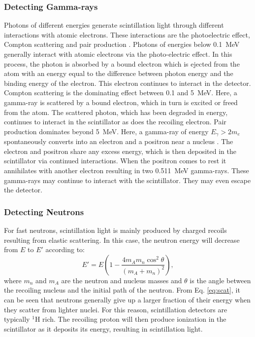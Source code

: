 \documentclass[main.tex]{subfiles}
\begin{document}
\subsubsection{Detecting Gamma-rays}
Photons of different energies generate scintillation light through different interactions with atomic electrons. These interactions are the photoelectric effect, Compton scattering and pair production \cite{Krane}. 
Photons of energies below \SI{0.1}{\MeV} generally interact with atomic electrons via the photo-electric effect. In this process, the photon is absorbed by a bound electron which is ejected from the atom with an energy equal to the difference between photon energy and the binding energy of the electron. This electron continues to interact in the detector.
Compton scattering is the dominating effect between 0.1 and \SI{5}{\MeV}. Here, a gamma-ray is scattered by a bound electron, which in turn is excited or freed from the atom. The scattered photon, which has been degraded in energy, continues to interact in the scintillator as does the recoiling electron.
Pair production dominates beyond \SI{5}{\MeV}. Here, a gamma-ray of energy $E_\gamma>2m_e$ spontaneously converts into an electron and a positron near a nucleus \cite{Krane}. The electron and positron share any excess energy, which is then deposited in the scintillator via continued interactions. When the positron comes to rest it annihilates with another electron resulting in two \SI{0.511}{\MeV} gamma-rays. These gamma-rays may continue to interact with the scintillator. They may even escape the detector.


\subsubsection{Detecting Neutrons}
For fast neutrons, scintillation light is mainly produced by charged recoils resulting from elastic scattering. In this case, the neutron energy will decrease from $E$ to $E'$ according to:
\begin{equation}
	E' = E\left(1 - \frac{4m_A m_n \cos^2{\theta}}{\left(m_A + m_n\right)^2}\right),
	\label{eq:scat}
\end{equation}
where $m_n$ and $m_A$ are the neutron and nucleus masses and $\theta$ is the angle between the recoiling nucleus and the initial path of the neutron. From Eq. \ref{eq:scat}, it can be seen that neutrons generally give up a larger fraction of their energy when they scatter from lighter nuclei. 
For this reason, scintillation detectors are typically $^1$H rich. The recoiling proton will then produce ionization in the scintillator as it deposits its energy, resulting in scintillation light. 
\end{document}
